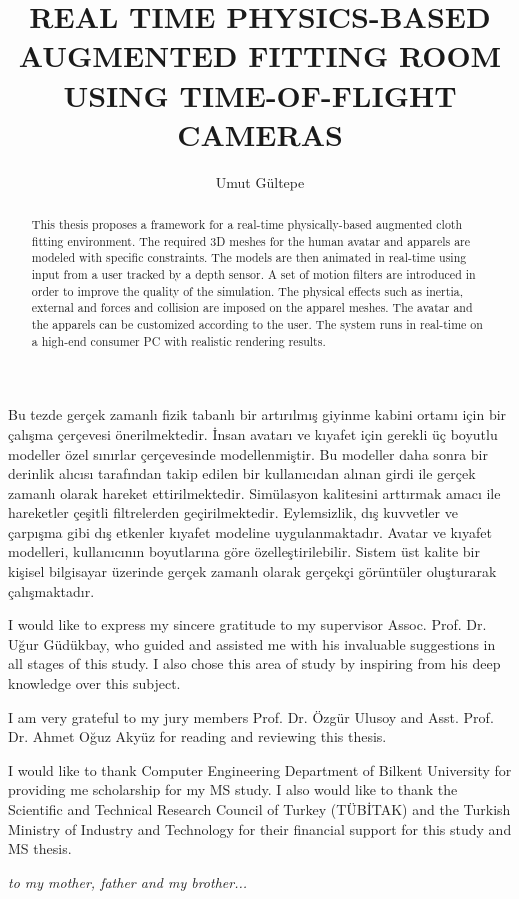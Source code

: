 \documentclass{buthesis}
\title{REAL TIME PHYSICS-BASED AUGMENTED FITTING ROOM USING TIME-OF-FLIGHT CAMERAS}
\author{Umut G{\"u}ltepe}
\begin{document}
\titlepageMS
\signaturepageMS
\begin{abstract}
\indent This thesis proposes a framework for a real-time physically-based augmented cloth fitting environment. The required 3D meshes for the human avatar and apparels are modeled with specific constraints. The models are then animated in real-time using input from a user tracked by a depth sensor. A set of motion filters are introduced in order to improve the quality of the simulation. The physical effects such as inertia, external and forces and collision are imposed on the apparel meshes. The avatar and the apparels can be customized according to the user. The system runs in real-time on a high-end consumer PC with realistic rendering results.
\end{abstract}


\begin{ozet}
\indent Bu tezde ger\c{c}ek zamanl{\i} fizik tabanl{\i} bir art{\i}r{\i}lm{\i}\c{s} giyinme kabini ortam{\i} i\c{c}in bir \c{c}al{\i}\c{s}ma \c{c}er\c{c}evesi {\"o}nerilmektedir. {\.I}nsan avatar{\i} ve k{\i}yafet i\c{c}in gerekli {\"u}\c{c} boyutlu modeller {\"o}zel s{\i}n{\i}rlar \c{c}er\c{c}evesinde modellenmi\c{s}tir. Bu modeller daha sonra bir derinlik al{\i}c{\i}s{\i} taraf{\i}ndan takip edilen bir kullan{\i}c{\i}dan al{\i}nan girdi ile ger\c{c}ek zamanl{\i} olarak hareket ettirilmektedir. Sim{\"u}lasyon kalitesini artt{\i}rmak amac{\i} ile hareketler \c{c}e\c{s}itli filtrelerden ge\c{c}irilmektedir.  Eylemsizlik, d{\i}\c{s} kuvvetler ve \c{c}arp{\i}\c{s}ma gibi d{\i}\c{s} etkenler k{\i}yafet modeline uygulanmaktad{\i}r. Avatar ve k{\i}yafet modelleri, kullan{\i}c{\i}n{\i}n boyutlar{\i}na g{\"o}re {\"o}zelle\c{s}tirilebilir. Sistem {\"u}st kalite bir ki\c{s}isel bilgisayar {\"u}zerinde ger\c{c}ek zamanl{\i} olarak ger\c{c}ek\c{c}i g{\"o}r{\"u}nt{\"u}ler olu\c{s}turarak \c{c}al{\i}\c{s}maktad{\i}r. 
\end{ozet}

\begin{ack}

I would like to express my sincere gratitude to my supervisor Assoc. Prof. Dr. U\u{g}ur G{\"u}d{\"u}kbay, who guided and assisted me with his invaluable suggestions in all stages of this study. I also chose this area of study by inspiring from his deep knowledge over this subject.

I am very grateful to my jury members Prof. Dr. \"{O}zg\"{u}r Ulusoy and Asst. Prof. Dr. Ahmet O\u{g}uz Aky\"{u}z for reading and reviewing this thesis. 

I would like to thank Computer Engineering Department of Bilkent University for providing me scholarship for my MS study. I also would like to thank the Scientific and Technical Research Council of Turkey (T{\"U}B\.{I}TAK) and the Turkish Ministry of Industry and Technology for their financial support for this study and MS thesis.

\end{ack}

\newpage
\setcounter{page}{5}
\vspace*{5cm}
\begin{center}
{\large \it to my mother, father and my brother...}
\end{center}

\tableofcontents
\listoffigures
\listoftables
\listofalgorithms
\newpage
\newpage
%
\newpage
\pagestyle{headings}
\makeatother
\end{document}
